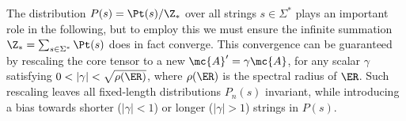 The distribution $P(s) = \Pt(s) / \Z_*$ over all strings $s\in\Sigma^*$ plays an important role in the following, but to employ this we must ensure the infinite summation $\Z_* = \sum_{s\in\Sigma^*} \Pt(s)$ does in fact converge. This convergence can be guaranteed by rescaling the core tensor to a new $\mc{A}' = \gamma \mc{A}$, for any scalar $\gamma$ satisfying $0 < |\gamma| < \sqrt{\rho(\ER)}$, where $\rho(\ER)$ is the spectral radius of $\ER$. Such rescaling leaves all fixed-length distributions $P_n(s)$ invariant, while introducing a bias towards shorter ($|\gamma| < 1$) or longer ($|\gamma| > 1$) strings in $P(s)$. 

